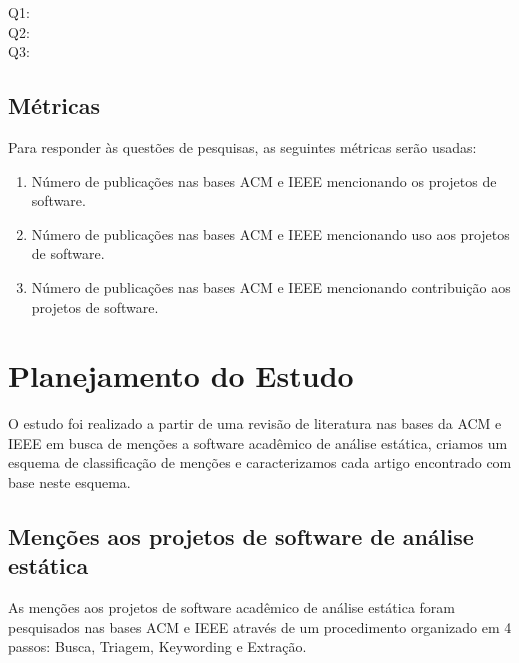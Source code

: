 \begin{description}
  \item [Q1:] \EstudoDoisQuestaoUm
  \item [Q2:] \EstudoDoisQuestaoDois
  \item [Q3:] \EstudoDoisQuestaoTres
\end{description}

\subsection{Métricas}

Para responder às questões de pesquisas, as seguintes métricas serão usadas:

\begin{enumerate}
  \item Número de publicações nas bases ACM e IEEE mencionando os projetos de software.
  \item Número de publicações nas bases ACM e IEEE mencionando uso aos projetos de software.
  \item Número de publicações nas bases ACM e IEEE mencionando contribuição aos projetos de software.
\end{enumerate}


\section{Planejamento do Estudo} \label{estudo2:planejamento} %

O estudo foi realizado a partir de uma revisão de literatura nas bases da ACM e
IEEE em busca de menções a software acadêmico de análise estática, criamos um
esquema de classificação de menções e caracterizamos cada artigo encontrado com
base neste esquema.

\subsection{Menções aos projetos de software de análise estática}

As menções aos projetos de software acadêmico de análise estática foram pesquisados nas
bases ACM e IEEE através de um procedimento organizado em 4 passos: Busca,
Triagem, Keywording e Extração.

